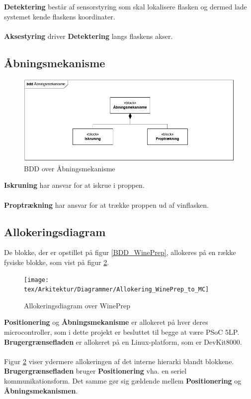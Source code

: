 \noindent\textbf{Detektering} består af sensorstyring som skal lokalisere flasken og dermed lade systemet kende flaskens koordinater.
\\
\\
\textbf{Aksestyring} driver \textbf{Detektering} langs flaskens akser.

\subsection{Åbningsmekanisme}
\begin{figure}[H]
	\centerline{\includegraphics[scale=0.4]{Diagrammer/BDD_Aabningsmekanisme.png}}
	\caption{BDD over Åbningsmekanisme}
	\label{BDD_Aabningsmekanisme}
\end{figure}

\noindent\textbf{Iskruning} har ansvar for at iskrue i proppen.
\\
\\
\textbf{Proptrækning} har ansvar for at trække proppen ud af vinflasken.

\subsection{Allokeringsdiagram}
De blokke, der er opstillet på figur \ref{BDD_WinePrep}, allokeres på en række fysiske blokke, som vist på figur \ref{Allokering_WinePrep}.

\begin{figure}[H]
	\centerline{\texttt{[image: tex/Arkitektur/Diagrammer/Allokering\_WinePrep\_to\_MC]}}
	\caption{Allokeringsdiagram over WinePrep}
	\label{Allokering_WinePrep}
\end{figure}

\noindent\textbf{Positionering} og \textbf{Åbningsmekanisme} er allokeret på hver deres microcontroller, som i dette projekt er besluttet til begge at være PSoC 5LP. \textbf{Brugergrænsefladen} er allokeret på en Linux-platform, som er DevKit8000.
\\
\\
\noindent Figur \ref{Allokering_WinePrep} viser ydermere allokeringen af det interne hierarki blandt blokkene. \textbf{Brugergrænsefladen} bruger \textbf{Positionering} vha. en seriel kommunikationsform. Det samme gør sig gældende mellem \textbf{Positionering} og \textbf{Åbningsmekanismen}.


